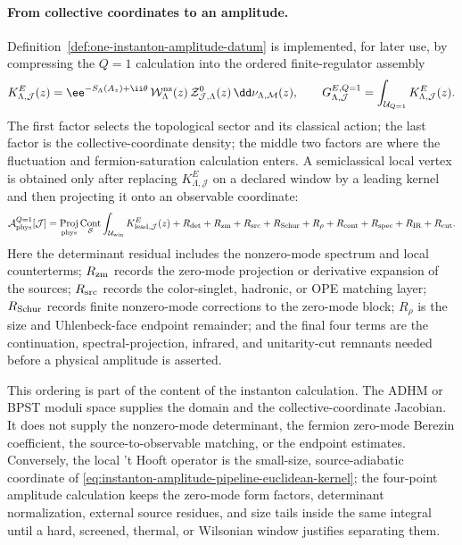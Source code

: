 \paragraph{From collective coordinates to an amplitude.}
Definition~\ref{def:one-instanton-amplitude-datum} is implemented, for later
use, by compressing the \(Q=1\) calculation into the ordered finite-regulator
assembly
\begin{equation}
  K_{\Lambda,\mathcal J}^{E}(z)
  =
  \ee^{-S_\Lambda(A_z)+\ii\theta}\,
  \mathcal W_{\Lambda}^{\rm nz}(z)\,
  \mathcal Z_{\mathcal J,\Lambda}^{0}(z)\,
  \dd\nu_{\Lambda,\mathcal M}(z),
  \qquad
  G_{\Lambda,\mathcal J}^{E,Q=1}
  =
  \int_{\mathcal U_{Q=1}}K_{\Lambda,\mathcal J}^{E}(z).
  \label{eq:instanton-amplitude-pipeline-euclidean-kernel}
\end{equation}
The first factor selects the topological sector and its classical action; the
last factor is the collective-coordinate density; the middle two factors are
where the fluctuation and fermion-saturation calculation enters.  A
semiclassical local vertex is obtained only after replacing
\(K_{\Lambda,\mathcal J}^{E}\) on a declared window by a leading kernel and
then projecting it onto an observable coordinate:
\begin{equation}
  \mathcal A_{\rm phys}^{Q=1}[\mathcal J]
  =
  \operatorname*{Proj}_{\rm phys}
  \operatorname*{Cont}_{\mathcal S}
  \int_{\mathcal U_{\rm win}}
  K_{{\rm lead},\mathcal J}^{E}(z)
  +
  R_{\rm det}+R_{\rm zm}+R_{\rm src}+R_{\rm Schur}
  +R_{\rho}+R_{\rm cont}+R_{\rm spec}+R_{\rm IR}+R_{\rm cut}.
  \label{eq:instanton-amplitude-pipeline-physical-map}
\end{equation}
Here the determinant residual includes the nonzero-mode spectrum and local
counterterms; \(R_{\rm zm}\) records the zero-mode projection or derivative
expansion of the sources; \(R_{\rm src}\) records the color-singlet,
hadronic, or OPE matching layer; \(R_{\rm Schur}\) records finite
nonzero-mode corrections to the zero-mode block; \(R_{\rho}\) is the size and
Uhlenbeck-face endpoint remainder; and the final four terms are the
continuation, spectral-projection, infrared, and unitarity-cut remnants
needed before a physical amplitude is asserted.

This ordering is part of the content of the instanton calculation.  The ADHM
or BPST moduli space supplies the domain and the collective-coordinate
Jacobian.  It does not supply the nonzero-mode determinant, the fermion
zero-mode Berezin coefficient, the source-to-observable matching, or the
endpoint estimates.  Conversely, the local 't Hooft operator is the
small-size, source-adiabatic coordinate of
\eqref{eq:instanton-amplitude-pipeline-euclidean-kernel}; the four-point
amplitude calculation keeps the zero-mode form factors, determinant
normalization, external source residues, and size tails inside the same
integral until a hard, screened, thermal, or Wilsonian window justifies
separating them.

